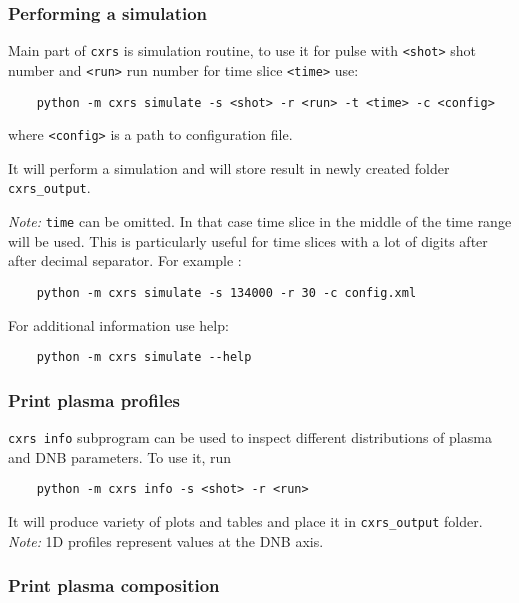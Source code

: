 \documentclass[../main.tex]{subfiles}
\begin{document}
\subsubsection{Performing a simulation}

Main part of \texttt{cxrs} is simulation routine, to use it for pulse with \texttt{<shot>} shot number and \texttt{<run>} run number for time slice \texttt{<time>} use:

\begin{verbatim}
    python -m cxrs simulate -s <shot> -r <run> -t <time> -c <config>
\end{verbatim}

where \texttt{<config>} is a path to configuration file.

It will perform a simulation and will store result in newly created folder \texttt{cxrs\_output}.

\emph{Note:} \texttt{time} can be omitted. In that case time slice in the middle of the time range will be used. This is particularly useful for time slices with a lot of digits after after decimal separator. For example :
\begin{verbatim}
    python -m cxrs simulate -s 134000 -r 30 -c config.xml
\end{verbatim}

For additional information use help:
\begin{verbatim}
    python -m cxrs simulate --help
\end{verbatim}

\subsubsection{Print plasma profiles}

\texttt{cxrs info} subprogram can be used to inspect different distributions of plasma and DNB parameters. To use it, run

\begin{verbatim}
    python -m cxrs info -s <shot> -r <run>
\end{verbatim}

It will produce variety of plots and tables and place it in \texttt{cxrs\_output} folder.
\emph{Note:} 1D profiles represent values at the DNB axis.

\subsubsection{Print plasma composition}
\end{document}
